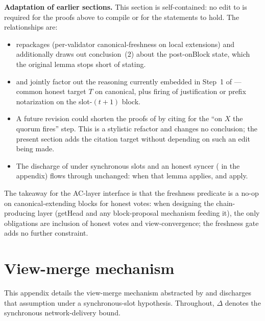 \documentclass{article}
\newcommand{\onBlock}{\textsf{onBlock}\xspace}
\newcommand{\getHead}{\textsf{getHead}\xspace}
\renewcommand{\paragraph}[1]{\vspace{7pt}\noindent\textbf{#1}}
\theoremstyle{plain}
\theoremstyle{definition}
\theoremstyle{remark}
\begin{document}
\paragraph{Adaptation of earlier sections.}
This section is self-contained: no edit to  is required for the proofs above to compile or for the statements to hold.
The relationships are:
\begin{itemize}
  \item {} repackages  (per-validator canonical-freshness on local extensions) and additionally draws out conclusion~(2) about the post-\onBlock state, which the original lemma stops short of stating.
  \item {} and  jointly factor out the reasoning currently embedded in Step~1 of  --- common honest target $T$ on canonical, plus firing of justification or prefix notarization on the slot-$(t+1)$ block.
  \item A future revision could shorten the proofs of  by citing  for the ``on $X$ the quorum fires'' step. This is a stylistic refactor and changes no conclusion; the present section adds the citation target without depending on such an edit being made.
  \item The discharge of  under synchronous slots and an honest syncer ( in the appendix) flows through unchanged: when that lemma applies,  and  apply.
\end{itemize}
The takeaway for the AC-layer interface is that the freshness predicate is a no-op on canonical-extending blocks for honest votes: when designing the chain-producing layer (\getHead and any block-proposal mechanism feeding it), the only obligations are inclusion of honest votes and view-convergence; the freshness gate adds no further constraint.

\appendix

\section{View-merge mechanism}\label{app:view-merge}

This appendix details the view-merge mechanism abstracted by  and discharges that assumption under a synchronous-slot hypothesis.
Throughout, $\Delta$ denotes the synchronous network-delivery bound.
\end{document}
